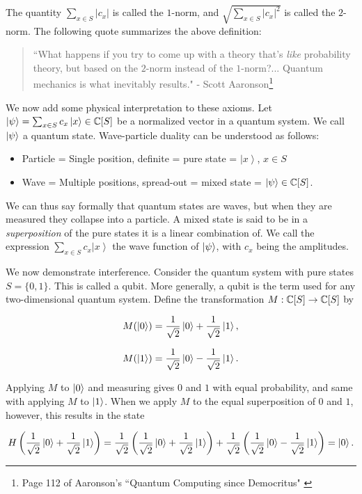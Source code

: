 \documentclass{article}
\theoremstyle{definition}
\numberwithin{figure}{section}
\begin{document}
The quantity $\sum_{x\in S}|c_x|$ is called the $1$-norm, and $\sqrt{\sum_{x\in S}|c_x|^2}$ is called the $2$-norm. The following quote summarizes the above definition:

\begin{quote}
``What happens if you try to come up with a theory that's \textit{like} probability theory, but based on the $2$-norm instead of the $1$-norm?... Quantum mechanics is what inevitably results." - Scott Aaronson\footnote{Page 112 of Aaronson's ``Quantum Computing since Democritus" \cite{aaronson2013quantum}}
\end{quote}

We now add some physical interpretation to these axioms. Let $\left|\psi\right>=\sum_{x\in S}c_x\left|x\right>\in \mathbb{C}[S]$ be a normalized vector in a quantum system. We call $\left|\psi\right>$ a quantum state. Wave-particle duality can be understood as follows:

\begin{itemize}
\item Particle = Single position, definite = pure state = $\left|x\right>$, $x\in S$
\item Wave = Multiple positions, spread-out = mixed state = $\left|\psi\right>\in \mathbb{C}[S]$.
\end{itemize}

We can thus say formally that quantum states are waves, but when they are measured they collapse into a particle. A mixed state is said to be in a \textit{superposition} of the pure states it is a linear combination of. We call the expression $\sum_{x\in S}c_x \left|x\right>$ the wave function of $\left|\psi\right>$, with $c_x$ being the amplitudes.

We now demonstrate interference. Consider the quantum system with pure states $S=\{0,1\}$. This is called a qubit. More generally, a qubit is the term used for any two-dimensional quantum system. Define the transformation $M: \mathbb{C}[S]\to \mathbb{C}[S]$ by

$$M(\left|0\right>)=\frac{1}{\sqrt{2}}\left|0\right>+\frac{1}{\sqrt{2}}\left|1\right>,$$

$$M(\left|1\right>)=\frac{1}{\sqrt{2}}\left|0\right>-\frac{1}{\sqrt{2}}\left|1\right>.$$

Applying $M$ to $\left|0\right>$ and measuring gives $0$ and $1$ with equal probability, and same with applying $M$ to $\left|1\right>$. When we apply $M$ to the equal superposition of $0$ and $1$, however, this results in the state

$$H\left(\frac{1}{\sqrt{2}}\left|0\right>+\frac{1}{\sqrt{2}}\left|1\right>\right)=\frac{1}{\sqrt{2}}\left(\frac{1}{\sqrt{2}}\left|0\right>+\frac{1}{\sqrt{2}}\left|1\right>\right)+\frac{1}{\sqrt{2}}\left(\frac{1}{\sqrt{2}}\left|0\right>-\frac{1}{\sqrt{2}}\left|1\right>\right)=\left|0\right>.$$
\end{document}
